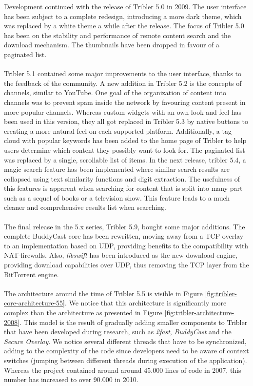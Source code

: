 Development continued with the release of Tribler 5.0 in 2009\cite{historyoftribler}. The user interface has been subject to a complete redesign, introducing a more dark theme, which was replaced by a white theme a while after the release. The focus of Tribler 5.0 has been on the stability and performance of remote content search and the download mechanism. The thumbnails have been dropped in favour of a paginated list.\\\\
Tribler 5.1 contained some major improvements to the user interface, thanks to the feedback of the community. A new addition in Tribler 5.2 is the concepts of channels, similar to YouTube. One goal of the organization of content into channels was to prevent spam inside the network by favouring content present in more popular channels. Whereas custom widgets with an own look-and-feel has been used in this version, they all got replaced in Tribler 5.3 by native buttons to creating a more natural feel on each supported platform. Additionally, a tag cloud with popular keywords has been added to the home page of Tribler to help users determine which content they possibly want to look for. The paginated list was replaced by a single, scrollable list of items. In the next release, tribler 5.4, a magic search feature has been implemented where similar search results are collapsed using text similarity functions and digit extraction. The usefulness of this features is apparent when searching for content that is split into many part such as a sequel of books or a television show. This feature leads to a much cleaner and comprehensive results list when searching.\\\\
The final release in the 5.x series, Tribler 5.9, bought some major additions. The complete BuddyCast core has been rewritten, moving away from a TCP overlay to an implementation based on UDP, providing benefits to the compatibility with NAT-firewalls. Also, \emph{libswift} has been introduced as the new download engine, providing download capabilities over UDP, thus  removing the TCP layer from the BitTorrent engine.\\\\
The architecture around the time of Tribler 5.5 is visible in Figure \ref{fig:tribler-core-architecture-55}. We notice that this architecture is significantly more complex than the architecture as presented in Figure \ref{fig:tribler-architecture-2008}. This model is the result of gradually adding smaller components to Tribler that have been developed during research, such as \emph{2fast}, \emph{BuddyCast} and the \emph{Secure Overlay}. We notice several different threads that have to be synchronized, adding to the complexity of the code since developers need to be aware of context switches (jumping between different threads during execution of the application). Whereas the project contained around around 45.000 lines of code in 2007, this number has increased to over 90.000 in 2010.

